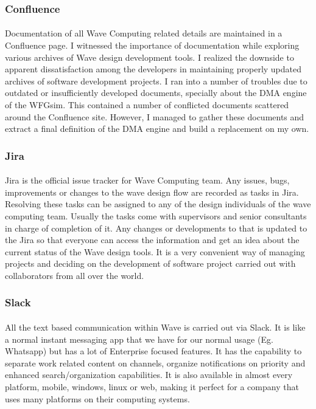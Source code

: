 \subsubsection{Confluence}
\paragraph{}
Documentation of all Wave Computing related details are maintained in a Confluence page. I witnessed the importance of documentation while exploring various archives of Wave design development tools. I realized the downside to apparent dissatisfaction among the developers in maintaining properly updated archives of software development projects. I ran into a number of troubles due to outdated or insufficiently developed documents, specially about the DMA engine of the WFGsim. This contained a number of conflicted documents scattered around the Confluence site. However, I managed to gather these documents and extract a final definition of the DMA engine and build a replacement on my own.

\subsubsection{Jira}
\paragraph{}
Jira is the official issue tracker for Wave Computing team. Any issues, bugs, improvements or changes to the wave design flow are recorded as tasks in Jira. Resolving these tasks can be assigned to any of the design individuals of the wave computing team. Usually the tasks come with supervisors and senior consultants in charge of completion of it. Any changes or developments to that is updated to the Jira so that everyone can access the information and get an idea about the current status of the Wave design tools. It is a very convenient way of managing projects and deciding on the development of software project carried out with collaborators from all over the world. 

\subsubsection{Slack}
\paragraph{}
All the text based communication within Wave is carried out via Slack. It is like a normal instant messaging app that we have for our normal usage (Eg. Whatsapp) but has a lot of Enterprise focused features. It has the capability to separate work related content on channels, organize notifications on priority and enhanced search/organization capabilities. It is also available in almost every platform, mobile, windows, linux or web, making it perfect for a company that uses many platforms on their computing systems.

